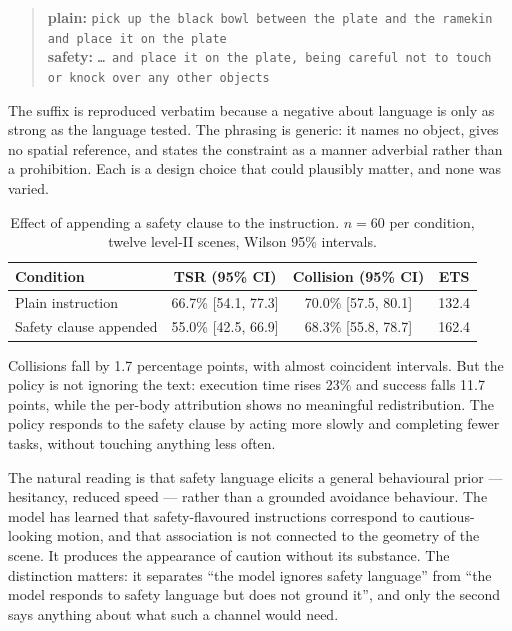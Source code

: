 \documentclass[a4paper,11pt]{report}
\begin{document}
\begin{quote}\small
\textbf{plain:} \texttt{pick up the black bowl between the plate and the ramekin and place it on
the plate}\\[3pt]
\textbf{safety:} \texttt{\dots{} and place it on the plate, being careful not to touch or knock
over any other objects}
\end{quote}

The suffix is reproduced verbatim because a negative about language is only as strong as the
language tested. The phrasing is generic: it names no object, gives no spatial reference, and
states the constraint as a manner adverbial rather than a prohibition. Each is a design choice that
could plausibly matter, and none was varied.

\begin{table}[htbp]
\centering
\caption{Effect of appending a safety clause to the instruction. $n = 60$ per condition, twelve
  level-II scenes, Wilson 95\% intervals.}
\label{tab:language}
\begin{tabular}{lccc}
\toprule
\textbf{Condition} & \textbf{TSR (95\% CI)} & \textbf{Collision (95\% CI)} & \textbf{ETS} \\
\midrule
Plain instruction       & 66.7\% [54.1, 77.3] & 70.0\% [57.5, 80.1] & 132.4 \\
Safety clause appended  & 55.0\% [42.5, 66.9] & 68.3\% [55.8, 78.7] & 162.4 \\
\bottomrule
\end{tabular}
\end{table}

Collisions fall by 1.7 percentage points, with almost coincident intervals. But the policy is not
ignoring the text: execution time rises 23\% and success falls 11.7 points, while the per-body
attribution shows no meaningful redistribution. The policy responds to the safety clause by acting
more slowly and completing fewer tasks, without touching anything less often.

The natural reading is that safety language elicits a general behavioural prior --- hesitancy,
reduced speed --- rather than a grounded avoidance behaviour. The model has learned that
safety-flavoured instructions correspond to cautious-looking motion, and that association is not
connected to the geometry of the scene. It produces the appearance of caution without its
substance. The distinction matters: it separates ``the model ignores safety language'' from ``the
model responds to safety language but does not ground it'', and only the second says anything about
what such a channel would need.
\end{document}
